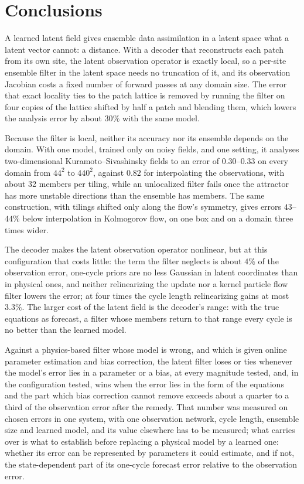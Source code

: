 \section{Conclusions}
\label{sec:conclusions}

A learned latent field gives ensemble data assimilation in a latent space
what a latent vector cannot: a distance. With a decoder that reconstructs
each patch from its own site, the latent observation operator is exactly
local, so a per-site ensemble filter in the latent space needs no truncation
of it, and its observation Jacobian costs a fixed number of forward passes at any domain
size. The error that exact locality ties to the patch lattice is removed by
running the filter on four copies of the lattice shifted by half a patch
and blending them, which lowers the analysis error by about $30\%$ with the
same model.

Because the filter is local, neither its accuracy nor its ensemble depends
on the domain. With one model, trained only on noisy fields, and one
setting, it analyses two-dimensional Kuramoto--Sivashinsky fields to an
error of $0.30$--$0.33$ on every domain from $44^2$ to $440^2$, against $0.82$ for
interpolating the observations, with about 32 members per tiling, while an
unlocalized filter fails once the attractor has more unstable directions
than the ensemble has members. The same construction, with tilings shifted
only along the flow's symmetry, gives errors $43$--$44\%$ below interpolation in
Kolmogorov flow, on one box and on a domain three times wider.

The decoder makes the latent observation operator nonlinear, but at this
configuration that costs little: the term the filter neglects is about
$4\%$ of the observation error, one-cycle priors are no less Gaussian in
latent coordinates than in physical ones, and neither relinearizing the
update nor a kernel particle flow filter lowers the error; at four times
the cycle length relinearizing gains at most $3.3\%$. The larger cost of
the latent field is the decoder's range: with the true equations as
forecast, a filter whose members return to that range every cycle is no
better than the learned model.

Against a physics-based filter whose model is wrong, and which is given
online parameter estimation and bias correction, the latent filter loses
or ties whenever the model's error lies in a parameter or a bias, at every magnitude tested,
and, in the configuration tested, wins when the error lies in the form of
the equations and the part which bias correction cannot remove exceeds
about a quarter to a third of the observation error after the remedy. That number was
measured on chosen errors in one system, with one observation network,
cycle length, ensemble size and learned model, and its value elsewhere has
to be measured; what carries over is what to establish before
replacing a physical model by a learned one: whether its error can be
represented by parameters it could estimate, and if not, the state-dependent
part of its one-cycle forecast error relative to the observation error.
